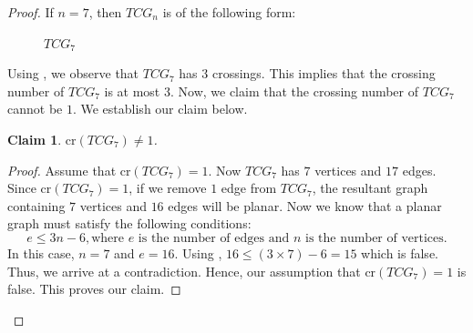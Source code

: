 \documentclass[12pt]{article}
\newtheorem{claim}[theorem]{Claim}
\begin{document}
	\begin{proof}
		If $n=7$, then $TCG_n$ is of the following form:
		\begin{figure}[H]
			\centering
			\caption{$TCG_7$}
			\label{Fig1}
			
		\end{figure}
		
		Using , we observe that $TCG_7$ has $3$ crossings. 
		This implies that the crossing number of $TCG_7$ is at most $3$.
		Now, we claim that the crossing number of $TCG_7$ cannot be $1$. We establish our claim below.
		\begin{claim}
			\label{crossing}
			$\text{cr}(TCG_7)\neq 1$.
		\end{claim}
		\begin{proof}
			Assume that $\text{cr}(TCG_7)=1$.
			Now $TCG_7$ has $7$ vertices and $17$ edges. Since $\text{cr}(TCG_7)=1$, if we remove $1$ edge from $TCG_7$, the resultant graph containing  $7$ vertices and $16$ edges will be planar.
			Now we know that a planar graph must satisfy the following conditions:
			\begin{equation}
				\label{planar}
				e\le 3n-6, \text{where } e \text { is the number of edges and } n \text{ is the number of vertices}.
			\end{equation}
			In this case, $n=7$ and $e=16$.
			Using , $16\le (3\times 7)-6=15$ which is false.
			Thus, we arrive at a contradiction.
			Hence, our assumption that $\text{cr}(TCG_7)=1$ is false.
			This proves our claim.
		\end{proof}
		

\end{proof}
\end{document}
